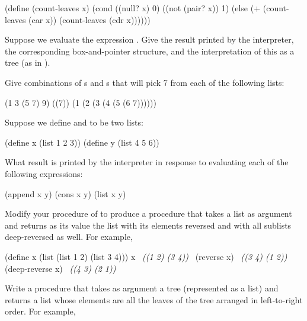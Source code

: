 \begin{codeBlock}
(define (count-leaves x)
  (cond ((null? x) 0)
        ((not (pair? x)) 1)
        (else (+ (count-leaves (car x))
                 (count-leaves (cdr x))))))
\end{codeBlock}

\begin{exerciseGroup}
\label{Exercise 2.24}
 Suppose we evaluate the
expression .  Give the result printed by the
interpreter, the corresponding box-and-pointer structure, and the
interpretation of this as a tree (as in ).

\label{Exercise 2.25}
 Give combinations of s
and s that will pick 7 from each of the following lists:

\begin{codeBlock}
(1 3 (5 7) 9)
((7))
(1 (2 (3 (4 (5 (6 7))))))
\end{codeBlock}

\label{Exercise 2.26}
 Suppose we define  and
 to be two lists:

\begin{codeBlock}
(define x (list 1 2 3))
(define y (list 4 5 6))
\end{codeBlock}

What result is printed by the interpreter in response to evaluating each of the
following expressions:

\begin{codeBlock}
(append x y)
(cons x y)
(list x y)
\end{codeBlock}

\label{Exercise 2.27}
 Modify your 
procedure of  to produce a  procedure
that takes a list as argument and returns as its value the list with its
elements reversed and with all sublists deep-reversed as well.  For example,

\begin{codeBlock}
(define x (list (list 1 2) (list 3 4)))
x
~\textit{((1 2) (3 4))}~
(reverse x)
~\textit{((3 4) (1 2))}~
(deep-reverse x)
~\textit{((4 3) (2 1))}~
\end{codeBlock}

\label{Exercise 2.28}
 Write a procedure 
that takes as argument a tree (represented as a list) and returns a list whose
elements are all the leaves of the tree arranged in left-to-right order.  For
example,


\end{exerciseGroup}
